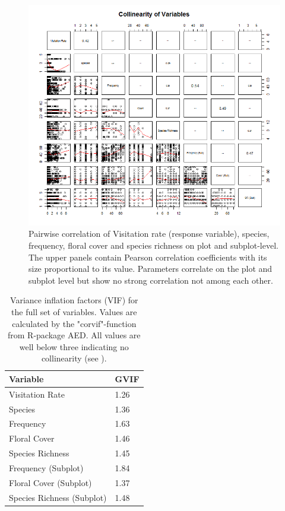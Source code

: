 \newpage

\begin{figure} [H] %
\centering
\includegraphics[width=16cm]{Images/pairs-plot}
 \caption{Pairwise correlation of Visitation rate (response variable), species, frequency, floral cover and species richness on plot and subplot-level. The upper panels contain Pearson correlation coefficients with its size proportional to its value. Parameters correlate on the plot and subplot level but show no strong correlation not among each other.}
 \label{fig:pairs-plot}
\end{figure}


\begin{table}[!htbp] 
  \centering
  \caption{Variance inflation factors (VIF) for the full set of variables. Values are calculated by the "corvif"-function from R-package AED. All values are well below three indicating no collinearity (see \citet{zuur2007analysing}).}
    \begin{tabular}{ll}
    \toprule
    \textbf{Variable} & \textbf{GVIF}\\
    \midrule
    Visitation Rate  	&  1.26\\
    Species 			 &  1.36\\
    Frequency 	  	    &  1.63\\
    Floral Cover   		 &  1.46\\
    Species Richness     &  1.45\\
    Frequency (Subplot) 	    &  1.84\\
    Floral Cover (Subplot)		  &  1.37\\
    Species Richness (Subplot)    &  1.48\\
    \bottomrule
    \end{tabular}%
\label{tab:VIF}
\end{table}%

